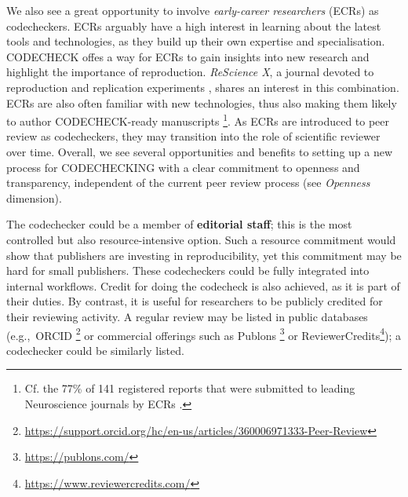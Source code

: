 \documentclass[12pt]{article}
\begin{document}
We also see a great opportunity to involve \emph{early-career researchers} (ECRs) as codecheckers.
ECRs arguably have a high interest in learning
about the latest tools and technologies, as they build up their own
expertise and specialisation.
CODECHECK offes a way for ECRs to gain insights into new research and
highlight the importance of reproduction.  
\emph{ReScience X}, a journal devoted to reproduction and replication experiments \cite{roesch_new_2020}, shares an interest in this combination.
ECRs are also often familiar with new technologies, thus also making them likely to author CODECHECK-ready manuscripts
\footnote{Cf. the 77\% of 141 registered reports that were submitted to leading Neuroscience journals by ECRs \cite{chambers_registered_2019}.}.
As ECRs are introduced to peer review as codecheckers, they may transition into the role of scientific reviewer over time.
Overall, we see several opportunities and benefits to setting up a new process for CODECHECKING with a clear commitment to openness and transparency, independent of the current peer review process (see \emph{Openness} dimension).

The codechecker could be a member of \textbf{editorial staff}; this is
the most controlled but also resource-intensive option.  Such a
resource commitment would show that publishers are investing in
reproducibility, yet this commitment may be hard for small publishers.
These codecheckers could be fully integrated into internal workflows.
Credit for doing the codecheck is also achieved, as it is part of
their duties.  By contrast, it is useful for researchers to be
publicly credited for their reviewing activity.  A regular review
may be listed in public databases (e.g.,~ORCID
\footnote{\href{https://support.orcid.org/hc/en-us/articles/360006971333-Peer-Review}{https://support.orcid.org/hc/en-us/articles/360006971333-Peer-Review}}
or commercial offerings such as Publons
\footnote{\href{https://publons.com/}{https://publons.com/}} or
ReviewerCredits\footnote{\href{https://www.reviewercredits.com/}{https://www.reviewercredits.com/}});
a codechecker could be similarly listed.
\end{document}
